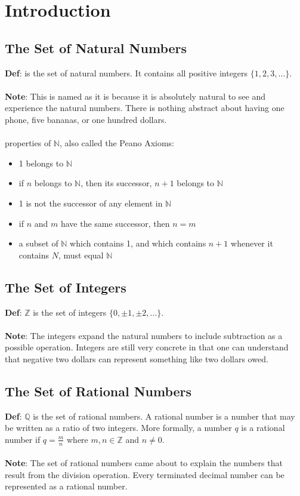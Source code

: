 \documentclass{article}
\begin{document}
\section{Introduction}

\subsection{The Set of Natural Numbers}
\textbf{Def}: \RR{} is the set of natural numbers. It contains all positive integers $\{1,2,3,\dots\}$. 
\\\\
\textbf{Note}: This is named as it is because it is absolutely natural to see and experience the natural numbers. There is nothing abstract about having one phone, five bananas, or one hundred dollars.
\\\\
properties of $\mathbb{N}$, also called the Peano Axioms:
\begin{itemize}
\item 1 belongs to $\mathbb{N}$
\item if $n$ belongs to $\mathbb{N}$, then its successor, $n+1$ belongs to $\mathbb{N}$
\item 1 is not the successor of any element in $\mathbb{N}$
\item if $n$ and $m$ have the same successor, then $n=m$
\item a subset of $\mathbb{N}$ which contains 1, and which contains $n+1$ whenever it contains $N$, must equal $\mathbb{N}$
\end{itemize}
\subsection{The Set of Integers}
\textbf{Def}: $\mathbb{Z}$ is the set of integers $\{0, \pm 1, \pm 2, \dots\}$. 
\\\\
\textbf{Note}: The integers expand the natural numbers to include subtraction as a possible operation. Integers are still very concrete in that one can understand that negative two dollars can represent something like two dollars owed.

\subsection{The Set of Rational Numbers}
\textbf{Def}: $\mathbb{Q}$ is the set of rational numbers. A rational number is a number that may be written as a ratio of two integers. More formally, a number $q$ is a rational number if $q=\frac{m}{n}$ where $m,n\in \mathbb{Z}$ and $n\neq 0$.
\\\\
\textbf{Note}: The set of rational numbers came about to explain the numbers that result from the division operation. Every terminated decimal number can be represented as a rational number. 
\end{document}
